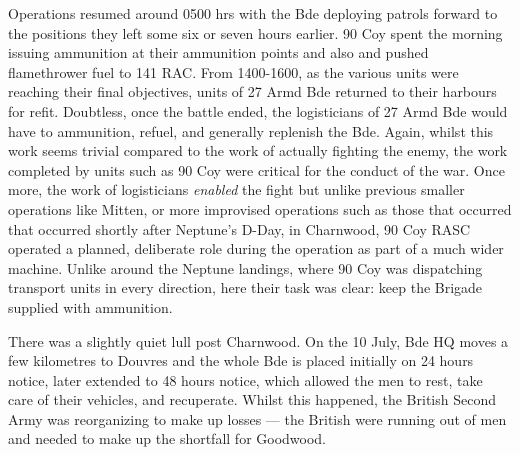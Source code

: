 \documentclass[noraggedright]{turabian-researchpaper}
\begin{document}
Operations resumed around 0500 hrs with the Bde deploying patrols forward to 
the positions they left some six or seven hours earlier.\autocite[9 July 1944]
{1318wd}  90 Coy spent the morning issuing ammunition at their ammunition 
points and also and pushed flamethrower fuel to 141 RAC.  
From 1400-1600, as the various units were reaching their final objectives, 
units of 27 Armd Bde returned to their harbours for refit.  Doubtless, once 
the battle ended, the logisticians of 27 Armd Bde would have to ammunition, 
refuel, and generally replenish the Bde.\autocite[9 July 1944]{90wd}  Again,
whilst this work seems trivial compared to the work of actually fighting
the enemy, the work completed by units such as 90 Coy were critical for the
conduct of the war.  Once more, the work of logisticians \textit{enabled} the 
fight but unlike previous smaller operations like Mitten, or more improvised
operations such as those that occurred that occurred shortly after Neptune's 
D-Day, in Charnwood, 90 Coy RASC operated a planned, deliberate role during
the operation as part of a much wider machine.  Unlike around the Neptune
landings, where 90 Coy was dispatching transport units in every direction,
here their task was clear:  keep the Brigade supplied with ammunition.

There was a slightly quiet lull post Charnwood.  On the 10 July, Bde
HQ moves a few kilometres to Douvres and the whole Bde is placed initially on 
24 hours notice, later extended to 48 hours notice, which allowed the men to 
rest, take care of their vehicles, and recuperate.\autocite[10, 13 July 1944]
{27wd}  
Whilst this happened, the British Second Army was reorganizing to make up 
losses --- the British were running out of men and needed to make up the 
shortfall for Goodwood.







\end{document}
